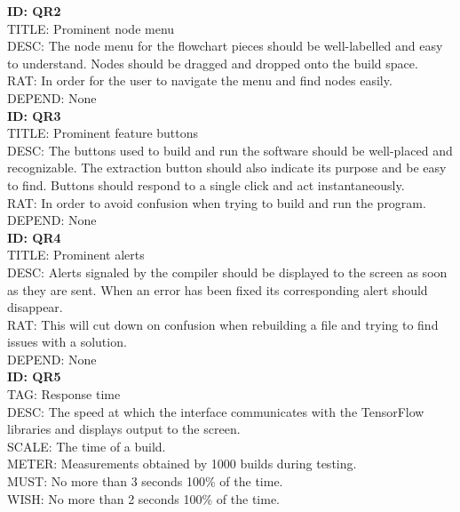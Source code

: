 \documentclass[a4paper,10pt]{article} \usepackage[margin=1.0in]{geometry} \usepackage{pdfpages} \usepackage{graphicx}
\begin{document}
\noindent
\textbf{ID: QR2}\\
TITLE: Prominent node menu\\
DESC: The node menu for the flowchart pieces should be well-labelled and easy to understand. Nodes should be dragged and dropped onto the build space.\\
RAT: In order for the user to navigate the menu and find nodes easily.\\
DEPEND: None\\

\noindent
\textbf{ID: QR3}\\
TITLE: Prominent feature buttons\\
DESC: The buttons used to build and run the software should be well-placed and recognizable. 
The extraction button should also indicate its purpose and be easy to find.
Buttons should respond to a single click and act instantaneously.\\
RAT: In order to avoid confusion when trying to build and run the program.\\
DEPEND: None\\

\noindent
\textbf{ID: QR4}\\
TITLE: Prominent alerts\\
DESC: Alerts signaled by the compiler should be displayed to the screen as soon as they are sent. 
When an error has been fixed its corresponding alert should disappear.\\
RAT: This will cut down on confusion when rebuilding a file and trying to find issues with a solution.\\
DEPEND: None\\

\noindent
\textbf{ID: QR5}\\
TAG: Response time\\
DESC: The speed at which the interface communicates with the TensorFlow libraries and displays output to the screen.\\
SCALE: The time of a build.\\
METER: Measurements obtained by 1000 builds during testing.\\
MUST: No more than 3 seconds 100\% of the time.\\
WISH: No more than 2 seconds 100\% of the time.\\

\newpage
\end{document}
